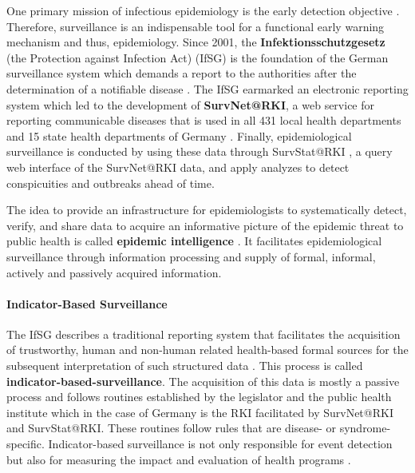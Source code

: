 One primary mission of infectious epidemiology is the early detection objective \citep{EarlyDetection}.
Therefore, surveillance is an indispensable tool for a functional early warning mechanism and thus, epidemiology.
Since 2001, the \textbf{Infektionsschutzgesetz} (the Protection against Infection Act) (\gls{IfSG})
is the foundation of the German surveillance system which demands a report to the authorities after the determination of a notifiable disease \citep{IfSG}.
The IfSG earmarked an electronic reporting system which led to the development of \textbf{SurvNet@RKI}, a web service for reporting communicable diseases that is used in all 431 local health departments and 15 state health departments of Germany \citep{Faensen2006}.
Finally, epidemiological surveillance is conducted by using these data through SurvStat@RKI \citep{Faensen2004}, a query web interface of the SurvNet@RKI data, and apply analyzes to detect conspicuities and outbreaks ahead of time.

The idea to provide an infrastructure for epidemiologists to systematically detect, verify, and share data to acquire an informative picture of the epidemic threat to public health is called \textbf{epidemic intelligence} \citep{EarlyDetection}. It facilitates epidemiological surveillance through information processing and supply of formal, informal, actively and passively acquired information.

\paragraph{Indicator-Based Surveillance}
The IfSG describes a traditional reporting system that facilitates the acquisition of trustworthy, human and non-human related health-based formal sources for the subsequent interpretation of such structured data \citep{EarlyDetection}. This process is called \textbf{indicator-based-surveillance}.
The acquisition of this data is mostly a passive process and follows routines established by the legislator and the public health institute which in the case of Germany is the RKI facilitated by SurvNet@RKI and SurvStat@RKI.
These routines follow rules that are disease- or syndrome-specific.
Indicator-based surveillance is not only responsible for event detection but also for measuring the impact and evaluation of health programs \citep{EarlyDetection}.

